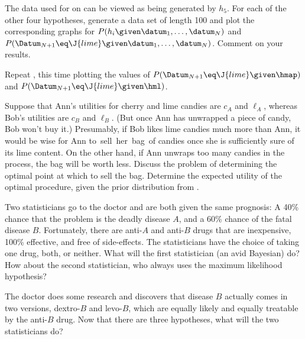 
\begin{exercise}
The data used for  on  can be viewed as being
generated by \(h_5\). For each of the other four hypotheses, generate a
data set of length 100 and plot the corresponding graphs for
\(P(h_i\given \datum_1,\ldots,\datum_N)\) and \(P(\Datum_{N+1}\eq \J{lime}\given \datum_1,\ldots,\datum_N)\).
Comment on your results.
\end{exercise} 

\begin{iexercise}
Repeat , this time plotting the values of
\(P(\Datum_{N+1}\eq \J{lime}\given \hmap)\) and \(P(\Datum_{N+1}\eq \J{lime}\given \hml)\).
\end{iexercise} 

\begin{exercise}
Suppose that Ann's utilities for cherry and lime candies are \(c_A\) and
\(\ell_A\), whereas Bob's utilities are \(c_B\) and \(\ell_B\).
(But once Ann has unwrapped a piece of candy, Bob won't buy it.)
Presumably, if Bob likes lime candies much more than Ann,
it would be wise for Ann to~sell~her~bag~of candies once she is sufficiently
sure of its lime content. On the other hand, if Ann unwraps too many
candies in the process, the bag will be worth less. Discuss the problem of determining the
optimal point at which to sell the bag. Determine the expected
utility of the optimal procedure, given the prior distribution from .
\end{exercise} 

\begin{exercise}
Two statisticians go to the doctor and are both given the same
prognosis: A 40\% chance that the problem is the deadly disease \(A\),
and a 60\% chance of the fatal disease \(B\). Fortunately, there are
anti-\(A\) and anti-\(B\) drugs that are inexpensive, 100\% effective, and
free of side-effects. The statisticians have the choice of taking one
drug, both, or neither. What will the first statistician (an avid
Bayesian) do?  How about the second statistician, who always uses the
maximum likelihood hypothesis?

The doctor does some research and discovers that disease \(B\) actually
comes in two versions, dextro-\(B\) and levo-\(B\), which are equally
likely and equally treatable by the anti-\(B\) drug.  Now that there are
three hypotheses, what will the two statisticians do?
\end{exercise} 



